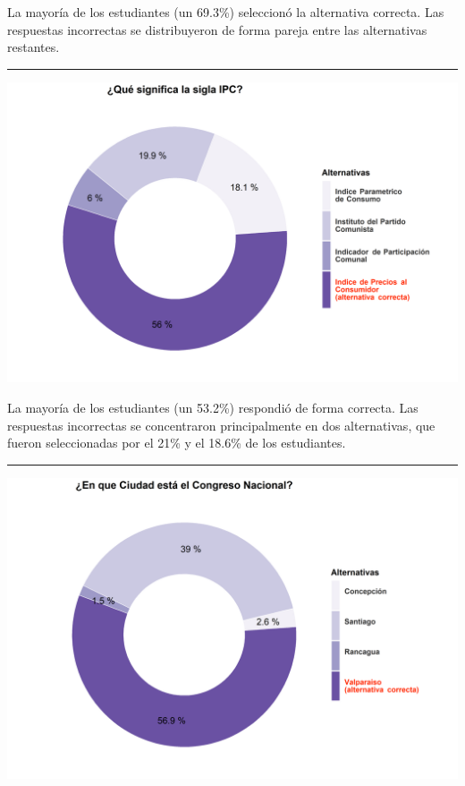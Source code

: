 \documentclass[
  14pt,
]{book}
\let\origfigure\figure
\let\endorigfigure\endfigure
\renewenvironment{figure}[1][2] {
  \expandafter\origfigure\expandafter[H]
} {
  \endorigfigure
}
\begin{document}
La mayoría de los estudiantes (un 69.3\%) seleccionó la alternativa correcta. Las respuestas incorrectas se distribuyeron de forma pareja entre las alternativas restantes.

\begin{center}\rule{0.5\linewidth}{0.5pt}\end{center}

\begin{figure}[!ht]

{\centering \includegraphics[width=0.8\linewidth,]{images/ccivico_13} 

}

\caption{Significado IPC}\label{fig:unnamed-chunk-17}
\end{figure}

La mayoría de los estudiantes (un 53.2\%) respondió de forma correcta. Las respuestas incorrectas se concentraron principalmente en dos alternativas, que fueron seleccionadas por el 21\% y el 18.6\% de los estudiantes.

\begin{center}\rule{0.5\linewidth}{0.5pt}\end{center}

\begin{figure}[!ht]

{\centering \includegraphics[width=0.8\linewidth,]{images/ccivico_14} 

}

\caption{Localización del Congreso}\label{fig:unnamed-chunk-18}
\end{figure}
\end{document}
